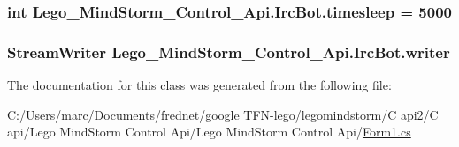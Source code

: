 \hypertarget{class_lego___mind_storm___control___api_1_1_irc_bot_1f3f263ea140bc708bc1dbaa19c12776}{
\subsubsection[{timesleep}]{\setlength{\rightskip}{0pt plus 5cm}int {\bf Lego\_\-MindStorm\_\-Control\_\-Api.IrcBot.timesleep} = 5000}}
\label{class_lego___mind_storm___control___api_1_1_irc_bot_1f3f263ea140bc708bc1dbaa19c12776}


\hypertarget{class_lego___mind_storm___control___api_1_1_irc_bot_a2ff9fcaa402bb836bd7b73a083035e9}{
\subsubsection[{writer}]{\setlength{\rightskip}{0pt plus 5cm}StreamWriter {\bf Lego\_\-MindStorm\_\-Control\_\-Api.IrcBot.writer}}}
\label{class_lego___mind_storm___control___api_1_1_irc_bot_a2ff9fcaa402bb836bd7b73a083035e9}




The documentation for this class was generated from the following file:\begin{CompactItemize}
\item 
C:/Users/marc/Documents/frednet/google TFN-lego/legomindstorm/C api2/C api/Lego MindStorm Control Api/Lego MindStorm Control Api/\hyperlink{_form1_8cs}{Form1.cs}\end{CompactItemize}
